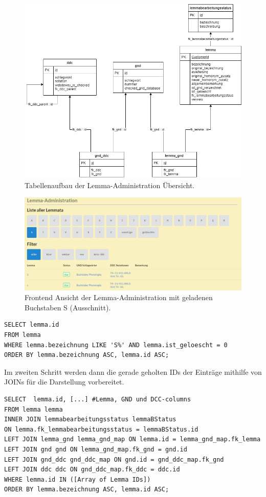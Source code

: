 \begin{figure}
	\centering
	\includegraphics[width=0.8\linewidth]{images/structure_lemmaadministration.png}
	\caption{Tabellenaufbau der Lemma-Administration Übersicht.}
	\label{img:lAdminStructure}
\end{figure}

\begin{figure}
	\centering
	\includegraphics[width=1\linewidth]{images/lemmaadministration_sample.PNG}
	\caption{Frontend Ansicht der Lemma-Administration mit geladenen Buchstaben S (Ausschnitt).}
	\label{img:lAdminSample}
\end{figure}

\lstset{language=SQL}
\begin{lstlisting}[frame=single] 
SELECT lemma.id
FROM lemma
WHERE lemma.bezeichnung LIKE 'S%' AND lemma.ist_geloescht = 0
ORDER BY lemma.bezeichnung ASC, lemma.id ASC;
\end{lstlisting}

Im zweiten Schritt werden dann die gerade geholten IDs der Einträge mithilfe von JOINs für die Darstellung vorbereitet.

\lstset{language=SQL}
\begin{lstlisting}[frame=single, label={lst:sqlQuery}] 
SELECT  lemma.id, [...] #Lemma, GND und DCC-columns        
FROM lemma lemma
INNER JOIN lemmabearbeitungsstatus lemmaBStatus
ON lemma.fk_lemmabearbeitungsstatus = lemmaBStatus.id
LEFT JOIN lemma_gnd lemma_gnd_map ON lemma.id = lemma_gnd_map.fk_lemma
LEFT JOIN gnd gnd ON lemma_gnd_map.fk_gnd = gnd.id
LEFT JOIN gnd_ddc gnd_ddc_map ON gnd.id = gnd_ddc_map.fk_gnd
LEFT JOIN ddc ddc ON gnd_ddc_map.fk_ddc = ddc.id
WHERE lemma.id IN ([Array of Lemma IDs])
ORDER BY lemma.bezeichnung ASC, lemma.id ASC;

\end{lstlisting}
